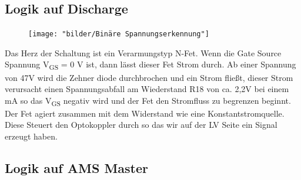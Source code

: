 \FloatBarrier
\subsection{Logik auf Discharge}
\label{sec: TSAL Logik Discharge}
\begin{figure}
	\centering
	\texttt{[image: "bilder/Binäre Spannungserkennung"]}
	\caption{}
	\label{fig:binare-spannungserkennung}
\end{figure}

Das Herz der Schaltung ist ein Verarmungstyp N-Fet. Wenn die Gate Source Spannung V\textsubscript{GS} = 0 V ist, dann lässt dieser Fet Strom durch. Ab einer Spannung von 47V wird die Zehner diode durchbrochen und ein Strom fließt, dieser Strom verursacht einen Spannungsabfall am Wiederstand R18 von ca. 2,2V bei einem mA so das V\textsubscript{GS} negativ wird und der Fet den Stromfluss zu begrenzen beginnt. Der Fet agiert zusammen mit dem Widerstand wie eine Konstantstromquelle. Diese Steuert den Optokoppler durch so das wir auf der LV Seite ein Signal erzeugt haben.

\FloatBarrier
\subsection{Logik auf AMS Master}

